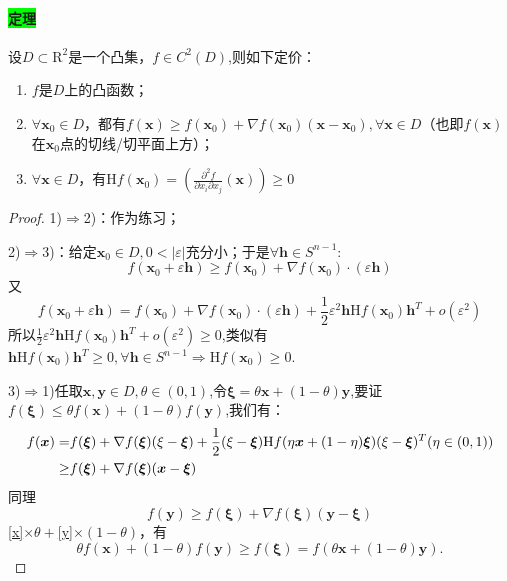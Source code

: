 \documentclass[UTF8]{ctexart}
\newcommand{\x}{\boldsymbol{x}}
\newcommand{\y}{\boldsymbol{y}}
\begin{document}
    \paragraph{\colorbox{lime}{定理}}设$D\subset\mathrm{R}^2$是一个凸集，$f\in C^2(D)$,则如下定价：
    \begin{enumerate}[1)]
        \item $f$是$D$上的凸函数；
        \item $\forall\x_0\in D$，都有$f(\x)\ge f(\x_0)+\nabla f(\x_0)(\x-\x_0),\forall\x\in D$（也即$f(\x)$在$\x_0$点的切线/切平面上方）；
        \item $\forall\x\in D$，有$\mathrm{H}f(\x_0)=\left(\frac{\partial^2f}{\partial x_i\partial x_j}(\x)\right)\ge 0$
    \end{enumerate}
    \begin{proof}
        1)$\Rightarrow $2)：作为练习；

        2)$\Rightarrow $3)：给定$\x_0\in D,0<|\varepsilon|$充分小；于是$\forall\boldsymbol{h}\in S^{n-1}:$ 
        $$f(\x_0+\varepsilon\boldsymbol{h})\ge f(\x_0)+\nabla f(\x_0)\cdot(\varepsilon\boldsymbol{h})$$
        又$$f(\x_0+\varepsilon\boldsymbol{h})=f(\x_0)+\nabla f(\x_0)\cdot(\varepsilon\boldsymbol{h})+\frac{1}{2}\varepsilon^2\boldsymbol{h}\mathrm{H}f(\x_0)\boldsymbol{h}^T+o(\varepsilon^2)$$
        所以$\frac{1}{2}\varepsilon^2\boldsymbol{h}\mathrm{H}f(\x_0)\boldsymbol{h}^T+o(\varepsilon^2)\ge 0$,类似有$\boldsymbol{h}\mathrm{H}f(\x_0)\boldsymbol{h}^T\ge 0,\forall\boldsymbol{h}\in S^{n-1}\Rightarrow \mathrm{H}f(\x_0)\ge 0$.

        3)$\Rightarrow $1)任取$\x,\y\in D,\theta\in (0,1)$,令$\boldsymbol{\xi}=\theta\x+(1-\theta)\y$,要证$f(\boldsymbol{\xi})\le\theta f(\x)+(1-\theta)f(\y)$,我们有：
        \begin{align}
            f(\x)=&f(\boldsymbol{\xi})+\nabla f(\boldsymbol{\xi})(\xi-\boldsymbol{\xi})+\frac{1}{2}(\xi-\boldsymbol{\xi})\mathrm{H}f(\eta\x+(1-\eta)\boldsymbol{\xi})(\xi-\boldsymbol{\xi})^T (\eta\in(0,1))\notag\\
            \ge&f(\boldsymbol{\xi})+\nabla f(\boldsymbol{\xi})(\x-\boldsymbol{\xi})\label{x}
        \end{align}
        同理
        \begin{equation}
            f(\y)\ge f(\boldsymbol{\xi})+\nabla f(\boldsymbol{\xi})(\y-\boldsymbol{\xi})\label{y}
        \end{equation}
        \eqref{x}$\times\theta+$\eqref{y}$\times(1-\theta)$，有
        $$\theta f(\x)+(1-\theta)f(\y)\ge f(\boldsymbol{\xi})=f(\theta\x+(1-\theta)\y).$$
    \end{proof}
\end{document}
